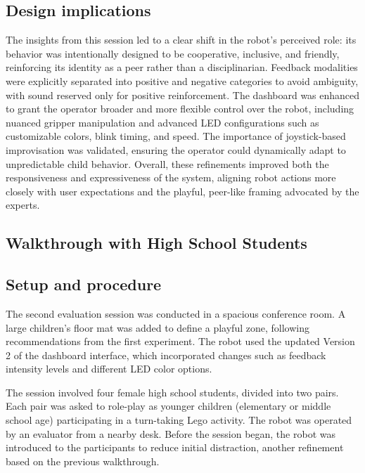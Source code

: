 \documentclass[a4paper]{usiinfbachelorproject}
\begin{document}
\subsection*{\textbf{Design implications}}
The insights from this session led to a clear shift in the robot's perceived role: its behavior was intentionally designed to be cooperative, inclusive, and friendly, reinforcing its identity as a peer rather than a disciplinarian.
Feedback modalities were explicitly separated into positive and negative categories to avoid ambiguity, with sound reserved only for positive reinforcement.
The dashboard was enhanced to grant the operator broader and more flexible control over the robot, including nuanced gripper manipulation and advanced LED configurations such as customizable colors, blink timing, and speed.
The importance of joystick-based improvisation was validated, ensuring the operator could dynamically adapt to unpredictable child behavior.
Overall, these refinements improved both the responsiveness and expressiveness of the system, aligning robot actions more closely with user expectations and the playful, peer-like framing advocated by the experts.

\subsection{\textbf{Walkthrough with High School Students}}\label{sec:high-school-walkthrough}
\subsection*{\textbf{Setup and procedure}}
The second evaluation session was conducted in a spacious conference room.
A large children's floor mat was added to define a playful zone, following recommendations from the first experiment.
The robot used the updated Version 2 of the dashboard interface, which incorporated changes such as feedback intensity levels and different LED color options.

The session involved four female high school students, divided into two pairs.
Each pair was asked to role-play as younger children (elementary or middle school age) participating in a turn-taking Lego activity.
The robot was operated by an evaluator from a nearby desk.
Before the session began, the robot was introduced to the participants to reduce initial distraction, another refinement based on the previous walkthrough.
\end{document}
